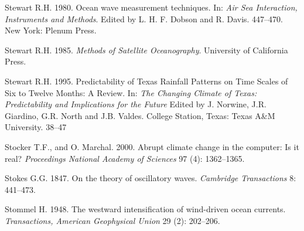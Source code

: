 \begin{thebibliography}{999}
Stewart R.H.  1980. Ocean wave measurement techniques. In: \textit{Air
  Sea Interaction, Instruments and Methods}. Edited by L. H. F. Dobson
and R. Davis.  447--470. New York: Plenum Press.
%

Stewart R.H.  1985. \textit{Methods of Satellite
  Oceanography}. University of California Press.
%

Stewart R.H.  1995. Predictability of Texas Rainfall Patterns on Time
Scales of Six to Twelve Months: A Review. In: \textit{The Changing
  Climate of Texas: Predictability and Implications for the Future}
Edited by J. Norwine, J.R.  Giardino, G.R. North and
J.B. Valdes. College Station, Texas: Texas A\&M University. 38--47
%

Stocker T.F., and O. Marchal.  2000. Abrupt climate change in the
computer: Is it real? \textit{Proceedings National Academy of
  Sciences} 97 (4): 1362--1365.
%

Stokes G.G.  1847. On the theory of oscillatory
waves. \textit{Cambridge Transactions} 8: 441--473.
%

Stommel H.  1948. The westward intensification of wind-driven ocean
currents. \textit{Transactions, American Geophysical Union} 29 (2):
202--206.
%


\end{thebibliography}
